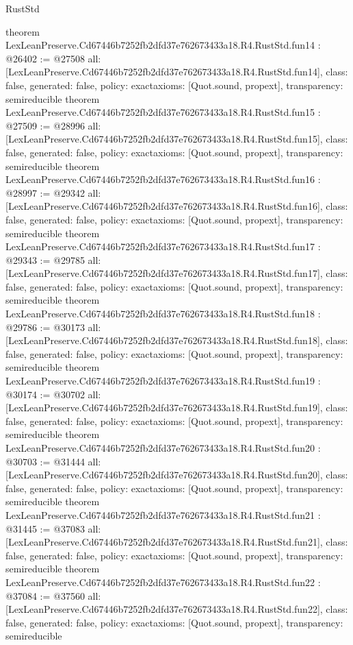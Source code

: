 \begin{lexlean}{RustStd}
\begin{coremodule}
{}
theorem LexLeanPreserve.Cd67446b7252fb2dfd37e762673433a18.R4.RustStd.fun14 : @26402 := @27508 {
  all: [LexLeanPreserve.Cd67446b7252fb2dfd37e762673433a18.R4.RustStd.fun14],
  class: false,
  generated: false,
  policy: exact{axioms: [Quot.sound, propext]},
  transparency: semireducible
}
theorem LexLeanPreserve.Cd67446b7252fb2dfd37e762673433a18.R4.RustStd.fun15 : @27509 := @28996 {
  all: [LexLeanPreserve.Cd67446b7252fb2dfd37e762673433a18.R4.RustStd.fun15],
  class: false,
  generated: false,
  policy: exact{axioms: [Quot.sound, propext]},
  transparency: semireducible
}
theorem LexLeanPreserve.Cd67446b7252fb2dfd37e762673433a18.R4.RustStd.fun16 : @28997 := @29342 {
  all: [LexLeanPreserve.Cd67446b7252fb2dfd37e762673433a18.R4.RustStd.fun16],
  class: false,
  generated: false,
  policy: exact{axioms: [Quot.sound, propext]},
  transparency: semireducible
}
theorem LexLeanPreserve.Cd67446b7252fb2dfd37e762673433a18.R4.RustStd.fun17 : @29343 := @29785 {
  all: [LexLeanPreserve.Cd67446b7252fb2dfd37e762673433a18.R4.RustStd.fun17],
  class: false,
  generated: false,
  policy: exact{axioms: [Quot.sound, propext]},
  transparency: semireducible
}
theorem LexLeanPreserve.Cd67446b7252fb2dfd37e762673433a18.R4.RustStd.fun18 : @29786 := @30173 {
  all: [LexLeanPreserve.Cd67446b7252fb2dfd37e762673433a18.R4.RustStd.fun18],
  class: false,
  generated: false,
  policy: exact{axioms: [Quot.sound, propext]},
  transparency: semireducible
}
theorem LexLeanPreserve.Cd67446b7252fb2dfd37e762673433a18.R4.RustStd.fun19 : @30174 := @30702 {
  all: [LexLeanPreserve.Cd67446b7252fb2dfd37e762673433a18.R4.RustStd.fun19],
  class: false,
  generated: false,
  policy: exact{axioms: [Quot.sound, propext]},
  transparency: semireducible
}
theorem LexLeanPreserve.Cd67446b7252fb2dfd37e762673433a18.R4.RustStd.fun20 : @30703 := @31444 {
  all: [LexLeanPreserve.Cd67446b7252fb2dfd37e762673433a18.R4.RustStd.fun20],
  class: false,
  generated: false,
  policy: exact{axioms: [Quot.sound, propext]},
  transparency: semireducible
}
theorem LexLeanPreserve.Cd67446b7252fb2dfd37e762673433a18.R4.RustStd.fun21 : @31445 := @37083 {
  all: [LexLeanPreserve.Cd67446b7252fb2dfd37e762673433a18.R4.RustStd.fun21],
  class: false,
  generated: false,
  policy: exact{axioms: [Quot.sound, propext]},
  transparency: semireducible
}
theorem LexLeanPreserve.Cd67446b7252fb2dfd37e762673433a18.R4.RustStd.fun22 : @37084 := @37560 {
  all: [LexLeanPreserve.Cd67446b7252fb2dfd37e762673433a18.R4.RustStd.fun22],
  class: false,
  generated: false,
  policy: exact{axioms: [Quot.sound, propext]},
  transparency: semireducible
}
\end{coremodule}
\end{lexlean}
